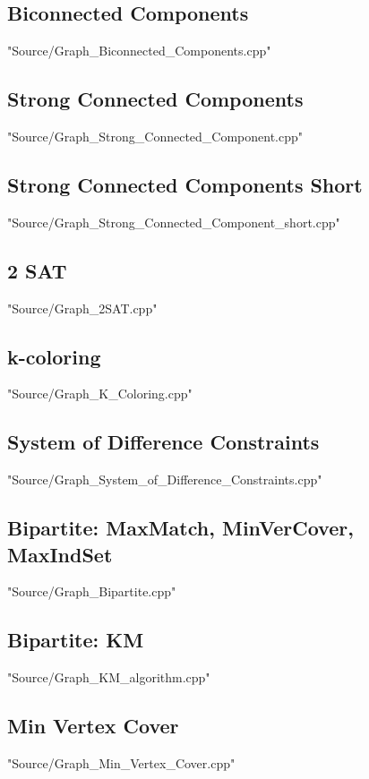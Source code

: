 \documentclass [10pt,twocolumn,oneside]{article}
\begin{document}
\subsection{Biconnected Components}
 {"Source/Graph_Biconnected_Components.cpp"}

\subsection{Strong Connected Components}
 {"Source/Graph_Strong_Connected_Component.cpp"}

\subsection{Strong Connected Components Short}
 {"Source/Graph_Strong_Connected_Component_short.cpp"}

\subsection{2 SAT}
 {"Source/Graph_2SAT.cpp"}

\subsection{k-coloring}
 {"Source/Graph_K_Coloring.cpp"}

\subsection{System of Difference Constraints}
 {"Source/Graph_System_of_Difference_Constraints.cpp"}

\subsection{Bipartite: MaxMatch, MinVerCover, MaxIndSet}
 {"Source/Graph_Bipartite.cpp"}

\subsection{Bipartite: KM}
 {"Source/Graph_KM_algorithm.cpp"}

\subsection{Min Vertex Cover}
 {"Source/Graph_Min_Vertex_Cover.cpp"}
\end{document}
